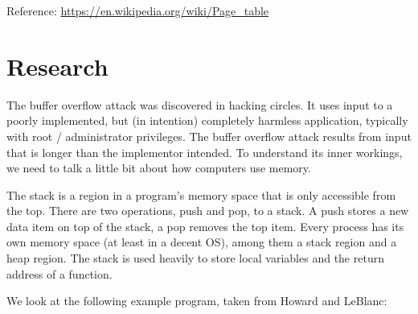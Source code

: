 \documentclass{article}
\begin{document}
Reference: \url{https://en.wikipedia.org/wiki/Page_table}

\section{Research}
The buffer overflow attack was discovered in hacking circles. It uses input to a poorly implemented, but (in intention) completely harmless application, typically with root / administrator privileges. The buffer overflow attack results from input that is longer than the implementor intended. To understand its inner workings, we need to talk a little bit about how computers use memory.

The stack is a region in a program's memory space that is only accessible from the top. There are two operations, push and pop, to a stack. A push stores a new data item on top of the stack, a pop removes the top item. Every process has its own memory space (at least in a decent OS), among them a stack region and a heap region. The stack is used heavily to store local variables and the return address of a function.

We look at the following example program, taken from Howard and LeBlanc:

\inputminted{c}{ex3.c}
\end{document}
